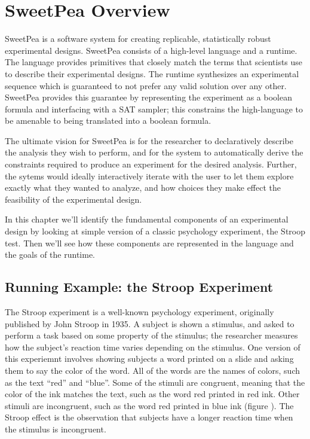 
\chapter{SweetPea Overview}

SweetPea is a software system for creating replicable, statistically robust experimental designs. SweetPea consists of a high-level language and a runtime. The language provides primitives that closely match the terms that scientists use to describe their experimental designs. The runtime synthesizes an experimental sequence which is guaranteed to not prefer any valid solution over any other. SweetPea provides this guarantee by representing the experiment as a boolean formula and interfacing with a SAT sampler; this constrains the high-language to be amenable to being translated into a boolean formula.

The ultimate vision for SweetPea is for the researcher to declaratively describe the analysis they wish to perform, and for the system to automatically derive the constraints required to produce an experiment for the desired analysis. Further, the sytems would ideally interactively iterate with the user to let them explore exactly what they wanted to analyze, and how choices they make effect the feasibility of the experimental design.

In this chapter we'll identify the fundamental components of an experimental design by looking at simple version of a classic psychology experiment, the Stroop test. Then we'll see how these components are represented in the language and the goals of the runtime.

\section{Running Example: the Stroop Experiment}

The Stroop experiment is a well-known psychology experiment, originally published by John Stroop in 1935. A subject is shown a stimulus, and asked to perform a task based on some property of the stimulus; the researcher measures how the subject's reaction time varies depending on the stimulus. One version of this experiemnt involves showing subjects a word printed on a slide and asking them to say the color of the word. All of the words are the names of colors, such as the text ``red'' and ``blue''. Some of the stimuli are congruent, meaning that the color of the ink matches the text, such as the word red printed in red ink. Other stimuli are incongruent, such as the word red printed in blue ink (figure ). The Stroop effect is the observation that subjects have a longer reaction time when the stimulus is incongruent.

